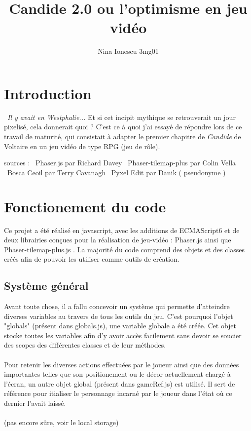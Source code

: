 \documentclass[11pt]{article}
\begin{document}
\title{Candide 2.0 ou l'optimisme en jeu vidéo }
\author{Nina Ionescu 3mg01}
\date{}
\maketitle

\section{Introduction}\
\textit {Il y avait en Westphalie...} Et si cet incipit mythique se retrouverait un jour pixelisé, cela donnerait quoi ? C'est ce à quoi j'ai essayé de répondre lors de ce travail de maturité, qui consistait à adapter le premier chapitre de \textit{Candide} de Voltaire en un jeu vidéo de type RPG (jeu de rôle).

sources : \
Phaser.js par Richard Davey \
Phaser-tilemap-plus par Colin Vella \
Bosca Ceoil par Terry Cavanagh \
Pyxel Edit par Danik ( pseudonyme )\


\section{Fonctionement du code}
Ce projet a été réalisé en javascript, avec les additions de ECMAScript6 et de deux librairies conçues pour la réalisation de jeu-vidéo : Phaser.js ainsi que Phaser-tilemap-plus.js . La majorité du code comprend des objets et des classes créés afin de pouvoir les utiliser comme outils de création.
\subsection{Système général}
	Avant toute chose, il a fallu concevoir un système qui permette d'atteindre diverses variables au travers de tous les outils du jeu. C'est pourquoi l'objet "globals" (présent dans globals.js), une variable globale a été créée. Cet objet stocke toutes les variables afin d'y avoir accès facilement sans devoir se soucier des scopes des différentes classes et de leur méthodes.\\\\
	Pour retenir les diverses actions effectuées par le joueur ainsi que des données importantes telles que son positionement ou le décor actuellement chargé à l'écran, un autre objet global (présent dans gameRef.js) est utilisé. Il sert de référence pour itialiser le personnage incarné par le joueur dans l'état où ce dernier l'avait laissé.\\\\ (pas encore sûre, voir le local storage)
 
\end{document}
